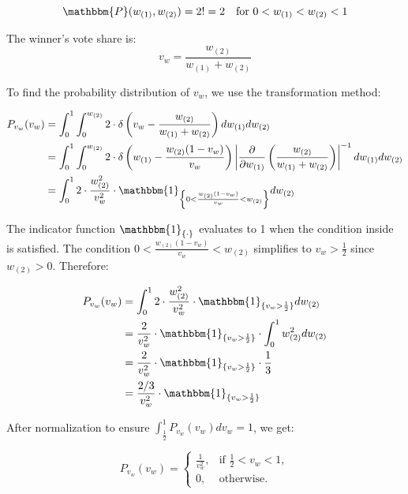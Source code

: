 \begin{equation}
    \mathbbm{P}(w_{(1)}, w_{(2)}) = 2! = 2 \quad \text{for } 0 < w_{(1)} < w_{(2)} < 1
\end{equation}

The winner's vote share is:
\begin{equation}
    v_w = \frac{w_{(2)}}{w_{(1)} + w_{(2)}}
\end{equation}

To find the probability distribution of $v_w$, we use the transformation method:

\begin{align}
    P_{v_w}(v_w) &= \int_0^1 \int_0^{w_{(2)}} 2 \cdot \delta\left(v_w - \frac{w_{(2)}}{w_{(1)} + w_{(2)}}\right) dw_{(1)} dw_{(2)} \\
    &= \int_0^1 \int_0^{w_{(2)}} 2 \cdot \delta\left(w_{(1)} - \frac{w_{(2)}(1-v_w)}{v_w}\right) \left|\frac{\partial}{\partial w_{(1)}}\left(\frac{w_{(2)}}{w_{(1)} + w_{(2)}}\right)\right|^{-1} dw_{(1)} dw_{(2)} \\
    &= \int_0^1 2 \cdot \frac{w_{(2)}^2}{v_w^2} \cdot \mathbbm{1}_{\left\{0 < \frac{w_{(2)}(1-v_w)}{v_w} < w_{(2)}\right\}} dw_{(2)}
\end{align}

The indicator function $\mathbbm{1}_{\{\cdot\}}$ evaluates to 1 when the condition inside is satisfied. The condition $0 < \frac{w_{(2)}(1-v_w)}{v_w} < w_{(2)}$ simplifies to $v_w > \frac{1}{2}$ since $w_{(2)} > 0$. Therefore:

\begin{align}
    P_{v_w}(v_w) &= \int_0^1 2 \cdot \frac{w_{(2)}^2}{v_w^2} \cdot \mathbbm{1}_{\{v_w > \frac{1}{2}\}} dw_{(2)} \\
    &= \frac{2}{v_w^2} \cdot \mathbbm{1}_{\{v_w > \frac{1}{2}\}} \cdot \int_0^1 w_{(2)}^2 dw_{(2)} \\
    &= \frac{2}{v_w^2} \cdot \mathbbm{1}_{\{v_w > \frac{1}{2}\}} \cdot \frac{1}{3} \\
    &= \frac{2/3}{v_w^2} \cdot \mathbbm{1}_{\{v_w > \frac{1}{2}\}}
\end{align}

After normalization to ensure $\int_{\frac{1}{2}}^1 P_{v_w}(v_w) dv_w = 1$, we get:

\begin{equation}
P_{v_w}(v_w) = 
\begin{cases}
     \frac{1}{v_w^2}, & \text{if } \frac{1}{2} < v_w < 1,\\
     0, & \text{otherwise}.
\end{cases}
\end{equation}

